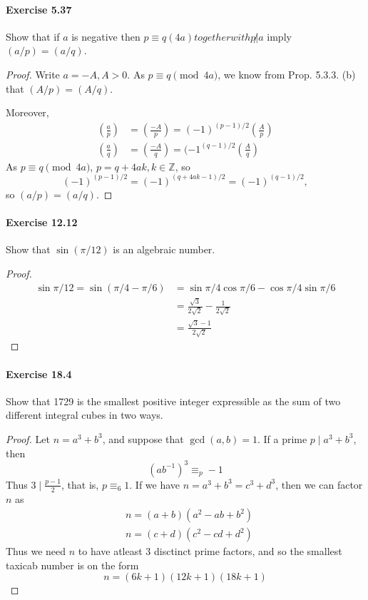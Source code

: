\documentclass{article}
\begin{document}
\paragraph{Exercise 5.37} Show that if $a$ is negative then $p \equiv q(4 a) together with p\not | a$ imply $(a / p)=(a / q)$.
\begin{proof}    
\newcommand{\legendre}[2]{\genfrac{(}{)}{}{}{#1}{#2}}
Write $a = -A, A>0$. As $p \equiv q \pmod {4a}$, we know from Prop. 5.3.3. (b) that $(A/p) = (A/q)$.

Moreover,
\begin{align*}
\legendre{a}{p}&= \legendre{-A}{p} = (-1)^{(p-1)/2} \legendre{A}{p}\\
\legendre{a}{q}&= \legendre{-A}{q} = (-1^{(q-1)/2} \legendre{A}{q}
\end{align*}
As  $p \equiv q \pmod {4a}$, $ p = q + 4ak, k\in \mathbb{Z}$, so
$$(-1)^{(p-1)/2} = (-1)^{(q+4ak-1)/2} = (-1)^{(q-1)/2},$$
so $(a/p) = (a/q)$.
\end{proof}



\paragraph{Exercise 12.12} Show that $\sin (\pi / 12)$ is an algebraic number.
\begin{proof}
$$
\begin{aligned}
    \sin \pi/12=\sin \left(\pi/4-\pi/6\right) & =\sin \pi/4 \cos \pi/6-\cos \pi/4 \sin \pi/6 \\
& =\frac{\sqrt{3}}{2 \sqrt{2}}-\frac{1}{2 \sqrt{2}} \\
& =\frac{\sqrt{3}-1}{2 \sqrt{2}}
\end{aligned}
$$
\end{proof}

\paragraph{Exercise 18.4} Show that 1729 is the smallest positive integer expressible as the sum of two different integral cubes in two ways.
\begin{proof}
    Let $n=a^3+b^3$, and suppose that $\operatorname{gcd}(a, b)=1$. If a prime $p \mid a^3+b^3$, then
$$
\left(a b^{-1}\right)^3 \equiv_p-1
$$
Thus $3 \mid \frac{p-1}{2}$, that is, $p \equiv_6 1$.
If we have $n=a^3+b^3=c^3+d^3$, then we can factor $n$ as
$$
\begin{aligned}
& n=(a+b)\left(a^2-a b+b^2\right) \\
& n=(c+d)\left(c^2-c d+d^2\right)
\end{aligned}
$$
Thus we need $n$ to have atleast 3 disctinct prime factors, and so the smallest taxicab number is on the form
$$
n=(6 k+1)(12 k+1)(18 k+1)
$$
\end{proof}
\end{document}
